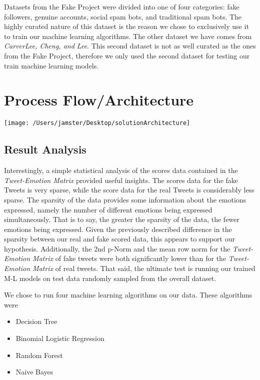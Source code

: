 \documentclass{article}[12pt]
\numberwithin{equation}{subsection}
\begin{document}
\begin{flushleft}
Datasets from the Fake Project were divided into one of four categories: fake followers, genuine accounts, social spam bots, and traditional spam bots.  The highly curated nature of this dataset is the reason we chose to exclusively use it to train our machine learning algorithms.  The other dataset we have comes from \emph{CarverLee, Cheng, and Lee}.  This second dataset is not as well curated as the ones from the Fake Project, therefore we only used the second dataset for testing our train machine learning models.


\section{Process Flow/Architecture}

\end{flushleft}\begin{center}
\texttt{[image: /Users/jamster/Desktop/solutionArchitecture]} 
\end{center}\begin{flushleft}


\section{Result Analysis}

Interestingly, a simple statistical analysis of the scores data contained in the \emph{Tweet-Emotion Matrix} provided useful insights.  The scores data for the fake Tweets is very sparse, while the score data for the real Tweets is considerably less sparse.  The sparsity of the data provides some information about the emotions expressed, namely the number of different emotions being expressed simultaneously.  That is to say, the greater the sparsity of the data, the fewer emotions being expressed.  Given the previously described difference in the sparsity between our real and fake scored data, this appears to support our hypothesis.  Additionally, the 2nd p-Norm and the mean row norm for the \emph{Tweet-Emotion Matrix} of fake tweets were both significantly lower than for the \emph{Tweet-Emotion Matrix} of real tweets.  That said, the ultimate test is running our trained M-L models on test data randomly sampled from the overall dataset. \newline

We chose to run four machine learning algorithms on our data.  These algorithms were

\begin{itemize}
\item Decision Tree
\item Binomial Logistic Regression
\item Random Forest
\item Naive Bayes
\end{itemize}


\end{flushleft}
\end{document}
